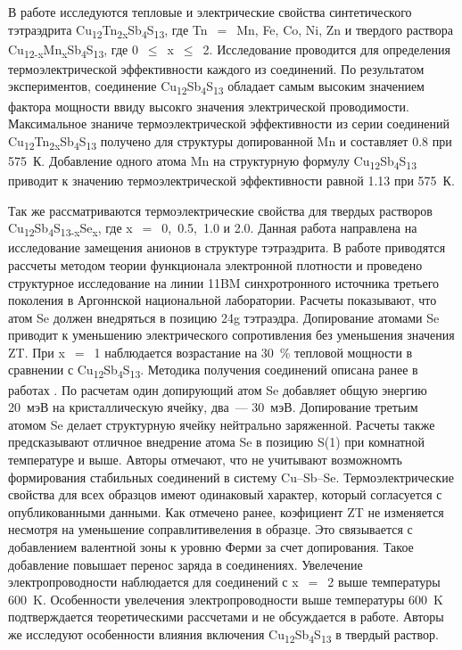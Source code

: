 В работе \cite{Heo2014} исследуются тепловые и электрические свойства синтетического тэтраэдрита Cu\textsubscript{12}Tn\textsubscript{2}\textsubscript{x}Sb\textsubscript{4}S\textsubscript{13}, где Tn~$=$~Mn, Fe, Co, Ni, Zn и твердого раствора Cu\textsubscript{12-x}Mn\textsubscript{x}Sb\textsubscript{4}S\textsubscript{13}, где 0~$\leq$~x~$\leq$~2. Исследование проводится для определения термоэлектрической эффективности каждого из соединений. По результатом экспериментов, соединение Cu\textsubscript{12}Sb\textsubscript{4}S\textsubscript{13} обладает самым высоким значением фактора мощности ввиду высокго значения электрической проводимости. Максимальное знаниче термоэлектрической эффективности из серии соединений Cu\textsubscript{12}Tn\textsubscript{2}\textsubscript{x}Sb\textsubscript{4}S\textsubscript{13} получено для структуры допированной Mn и составляет 0.8 при 575~К. Добавление одного атома  Mn на структурную формулу Cu\textsubscript{12}Sb\textsubscript{4}S\textsubscript{13} приводит к значению термоэлектрической эффективности равной 1.13 при 575~К.

Так же рассматриваются термоэлектрические свойства для твердых растворов Cu\textsubscript{12}Sb\textsubscript{4}S\textsubscript{13-x}Se\textsubscript{x}, где x~$=$~0,~0.5,~1.0 и 2.0\cite{Lu2016}. 
Данная работа направлена на исследование замещения анионов в структуре тэтраэдрита. 
В работе приводятся рассчеты методом теории функционала электронной плотности и проведено структурное исследование на линии 11BM  синхротронного источника третьего поколения в Аргоннской национальной лаборатории. 
Расчеты показывают, что атом Se должен внедряться в позицию 24g тэтраэдра. 
Допирование атомами Se приводит к уменьшению электрического сопротивления без уменьшения значения ZT. 
При x~$=$~1 наблюдается возрастание на 30~\% тепловой мощности в сравнении с Cu\textsubscript{12}Sb\textsubscript{4}S\textsubscript{13}.
Методика получения соединений описана ранее в работах \cite{Lu2013,Lu_2013b,Lu_2013}. По расчетам один допирующий атом Se  добавляет общую энергию 20~мэВ на кристаллическую ячейку, два~--- 30~мэВ. 
Допирование третьим атомом Se делает структурную ячейку нейтрально заряженной. Расчеты также предсказывают отличное внедрение атома Se в позицию S(1) при комнатной температуре и выше. Авторы отмечают, что не учитывают возможномть формирования стабильных соединений в систему Cu--Sb--Se. 
Термоэлектрические свойства для всех образцов имеют одинаковый характер, который согласуется с опубликованными данными. 
Как отмечено ранее, коэфициент ZT не изменяется несмотря на уменьшение соправлитивеления в образце. 
Это связывается с добавлением  валентной зоны к уровню Ферми за счет допирования. 
Такое добавление повышает перенос заряда в соединениях. 
Увелечение электропроводности наблюдается для соединений с  x~$=$~2 выше температуры 600~K. Особенности увелечения электропроводности выше температуры 600~K подтверждается теоретическими рассчетами и не обсуждается в работе. 
Авторы же исследуют особенности влияния включения Cu\textsubscript{12}Sb\textsubscript{4}S\textsubscript{13} в твердый раствор. 

